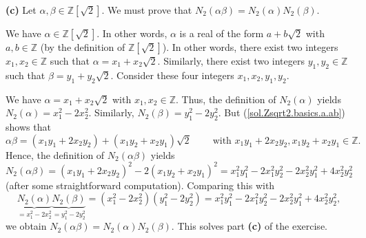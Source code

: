 \documentclass[paper=a4, fontsize=12pt]{scrartcl}%
\theoremstyle{plainsl}
\theoremstyle{definition}
\theoremstyle{remark}
\begin{document}
\textbf{(c)} Let $\alpha,\beta\in\mathbb{Z}\left[  \sqrt{2}\right]  $. We must
prove that $N_{2}\left(  \alpha\beta\right)  =N_{2}\left(  \alpha\right)
N_{2}\left(  \beta\right)  $.

We have $\alpha\in\mathbb{Z}\left[  \sqrt{2}\right]  $. In other words,
$\alpha$ is a real of the form $a+b\sqrt{2}$ with $a,b\in\mathbb{Z}$ (by the
definition of $\mathbb{Z}\left[  \sqrt{2}\right]  $). In other words, there
exist two integers $x_{1},x_{2}\in\mathbb{Z}$ such that $\alpha=x_{1}%
+x_{2}\sqrt{2}$. Similarly, there exist two integers $y_{1},y_{2}\in
\mathbb{Z}$ such that $\beta=y_{1}+y_{2}\sqrt{2}$. Consider these four
integers $x_{1},x_{2},y_{1},y_{2}$.

We have $\alpha=x_{1}+x_{2}\sqrt{2}$ with $x_{1},x_{2}\in\mathbb{Z}$. Thus,
the definition of $N_{2}\left(  \alpha\right)  $ yields $N_{2}\left(
\alpha\right)  =x_{1}^{2}-2x_{2}^{2}$. Similarly, $N_{2}\left(  \beta\right)
=y_{1}^{2}-2y_{2}^{2}$. But (\ref{sol.Zsqrt2.basics.a.ab}) shows that%
\[
\alpha\beta=\left(  x_{1}y_{1}+2x_{2}y_{2}\right)  +\left(  x_{1}y_{2}%
+x_{2}y_{1}\right)  \sqrt{2}\ \ \ \ \ \ \ \ \ \ \text{with }x_{1}y_{1}%
+2x_{2}y_{2},x_{1}y_{2}+x_{2}y_{1}\in\mathbb{Z}.
\]
Hence, the definition of $N_{2}\left(  \alpha\beta\right)  $ yields%
\[
N_{2}\left(  \alpha\beta\right)  =\left(  x_{1}y_{1}+2x_{2}y_{2}\right)
^{2}-2\left(  x_{1}y_{2}+x_{2}y_{1}\right)  ^{2}=x_{1}^{2}y_{1}^{2}-2x_{1}%
^{2}y_{2}^{2}-2x_{2}^{2}y_{1}^{2}+4x_{2}^{2}y_{2}^{2}%
\]
(after some straightforward computation). Comparing this with%
\[
\underbrace{N_{2}\left(  \alpha\right)  }_{=x_{1}^{2}-2x_{2}^{2}%
}\underbrace{N_{2}\left(  \beta\right)  }_{=y_{1}^{2}-2y_{2}^{2}}=\left(
x_{1}^{2}-2x_{2}^{2}\right)  \left(  y_{1}^{2}-2y_{2}^{2}\right)  =x_{1}%
^{2}y_{1}^{2}-2x_{1}^{2}y_{2}^{2}-2x_{2}^{2}y_{1}^{2}+4x_{2}^{2}y_{2}^{2},
\]
we obtain $N_{2}\left(  \alpha\beta\right)  =N_{2}\left(  \alpha\right)
N_{2}\left(  \beta\right)  $. This solves part \textbf{(c)} of the exercise.
\end{document}
